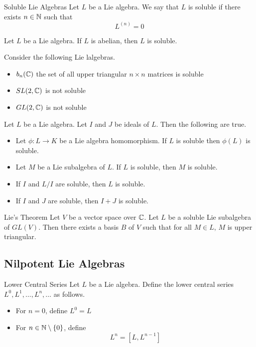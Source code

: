 \documentclass[a4paper]{article}
\begin{document}
\begin{defn}{Soluble Lie Algebras}{} Let $L$ be a Lie algebra. We say that $L$ is soluble if there exists $n\in\mathbb{N}$ such that $$L^{(n)}=0$$
\end{defn}

\begin{lmm}{}{} Let $L$ be a Lie algebra. If $L$ is abelian, then $L$ is soluble. 
\end{lmm}

\begin{eg}{}{} Consider the following Lie lalgebras. 
\begin{itemize}
\item $b_n(\mathbb{C})$ the set of all upper triangular $n\times n$ matrices is soluble
\item $SL(2,\mathbb{C})$ is not soluble
\item $GL(2,\mathbb{C})$ is not soluble
\end{itemize}
\end{eg}

\begin{prp}{}{} Let $L$ be a Lie algebra. Let $I$ and $J$ be ideals of $L$. Then the following are true. 
\begin{itemize}
\item Let $\phi:L\to K$ be a Lie algebra homomorphism. If $L$ is soluble then $\phi(L)$ is soluble. 
\item Let $M$ be a Lie subalgebra of $L$. If $L$ is soluble, then $M$ is soluble. 
\item If $I$ and $L/I$ are soluble, then $L$ is soluble. 
\item If $I$ and $J$ are soluble, then $I+J$ is soluble. 
\end{itemize}
\end{prp}

\begin{thm}{Lie's Theorem}{} Let $V$ be a vector space over $\mathbb{C}$. Let $L$ be a soluble Lie subalgebra of $GL(V)$. Then there exists a basis $B$ of $V$ such that for all $M\in L$, $M$ is upper triangular. 
\end{thm}

\subsection{Nilpotent Lie Algebras}
\begin{defn}{Lower Central Series}{} Let $L$ be a Lie algebra. Define the lower central series $L^0,L^1,\dots,L^n,\dots$ as follows. 
\begin{itemize}
\item For $n=0$, define $L^0=L$
\item For $n\in\mathbb{N}\setminus\{0\}$, define $$L^n=[L,L^{n-1}]$$
\end{itemize}
\end{defn}
\end{document}
